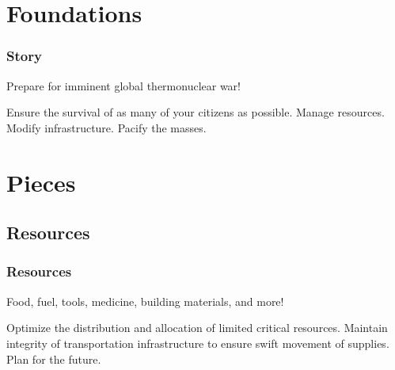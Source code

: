 \documentclass[ascpectratio=169]{beamer}
\begin{document}

\section{Foundations}


\begin{frame}

  \frametitle{Story}

  \begin{center}
    {\Large Prepare for imminent global thermonuclear war!}
  \end{center}

  \begin{outline}
    \1 Ensure the survival of as many of your citizens as possible.
    \1 Manage resources.
    \1 Modify infrastructure.
    \1 Pacify the masses.
  \end{outline}

\end{frame}


\section{Pieces}

\subsection{Resources}


\begin{frame}

  \frametitle{Resources}

  \begin{center}
    {\large Food, fuel, tools, medicine, building materials, and more!}
  \end{center}

  \begin{outline}
    \1 Optimize the distribution and allocation of limited critical resources.
    \1 Maintain integrity of transportation infrastructure to ensure swift
    movement of supplies.
    \1 Plan for the future.
  \end{outline}

\end{frame}

\end{document}
